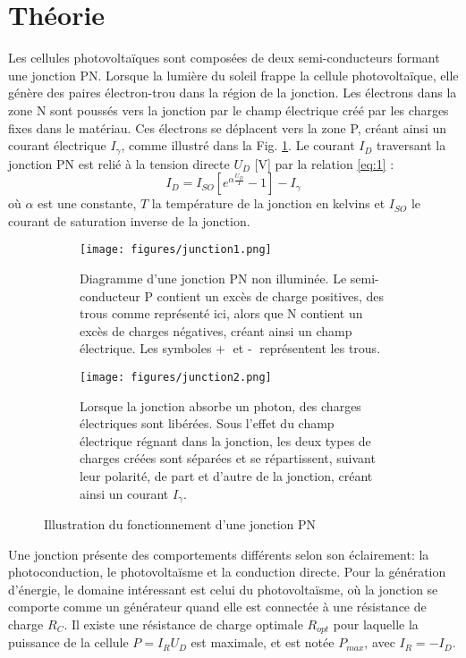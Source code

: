 \section{Théorie}

Les cellules photovoltaïques sont composées de deux semi-conducteurs formant une jonction PN. Lorsque la lumière du soleil frappe la cellule photovoltaïque, elle génère des paires électron-trou dans la région de la jonction.
Les électrons dans la zone N sont poussés vers la jonction par le champ électrique créé par les charges fixes dans le matériau. Ces électrons se déplacent vers la zone P, créant ainsi un courant électrique \(I_\gamma\), comme illustré dans la Fig. \ref{fig:pn}.
Le courant \(I_D\) traversant la jonction PN est relié à la tension directe \(U_D\) [\unit{\volt}] par la relation \ref{eq:1} \cite{notice}:
\begin{equation}
    I_D = I_{SO}[e^{\alpha\frac{U_D}{T}} - 1] - I_\gamma
    \label{eq:1}
\end{equation}
où \(\alpha\) est une constante, \(T\) la température de la jonction en kelvins et \(I_{SO}\) le courant de saturation inverse de la jonction.

\begin{figure}
    \centering
    \begin{subfigure}[t]{0.45\linewidth}
        \centering
        \texttt{[image: figures/junction1.png]}
        \caption{Diagramme d'une jonction PN non illuminée. Le semi-conducteur P contient un excès de charge positives, des trous comme représenté ici, alors que N contient un excès de charges négatives, créant ainsi un champ électrique. Les symboles \textcircled{+} et \textcircled{-} représentent les trous.}
    \end{subfigure}
    \hfill
    \begin{subfigure}[t]{0.45\linewidth}
        \centering
        \texttt{[image: figures/junction2.png]}
        \caption{Lorsque la jonction absorbe un photon, des charges électriques sont libérées. Sous l'effet du champ électrique régnant dans la jonction, les deux types de charges créées sont séparées et se répartissent, suivant leur
        polarité, de part et d'autre de la jonction, créant ainsi un courant \(I_\gamma\).}
    \end{subfigure}
    \caption{Illustration du fonctionnement d'une jonction PN \cite{nicole}}
    \label{fig:pn}
\end{figure}

Une jonction présente des comportements différents selon son éclairement: la photoconduction, le photovoltaïsme et la conduction directe.
Pour la génération d'énergie, le domaine intéressant est celui du photovoltaïsme, où la jonction se comporte comme un générateur quand elle est connectée à une résistance de charge \(R_C\).
Il existe une résistance de charge optimale \(R_{opt}\) pour laquelle la puissance de la cellule \(P = I_R U_D\) est maximale, et est notée \(P_{max}\), avec \(I_R = -I_D\).

